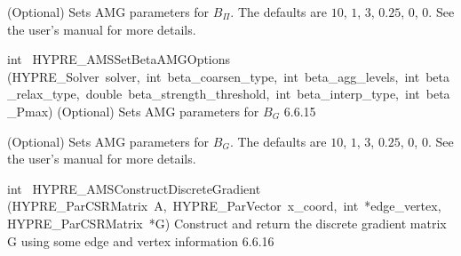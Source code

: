 \documentclass{article}
\begin{document}
\begin{cxxentry}
\begin{cxxentry}
\begin{cxxfunction}
\begin{cxxdoc}
(Optional) Sets AMG parameters for $B_\Pi$.
The defaults are $10$, $1$, $3$, $0.25$, $0$, $0$. See the user's manual for more details.
\end{cxxdoc}
\end{cxxfunction}
\begin{cxxfunction}
{int\ }
        {HYPRE\_AMSSetBetaAMGOptions}
        {(HYPRE\_Solver\ solver,\ int\ beta\_coarsen\_type,\ int\ beta\_agg\_levels,\ int\ beta\_relax\_type,\ double\ beta\_strength\_threshold,\ int\ beta\_interp\_type,\ int\ beta\_Pmax)}
        {
(Optional) Sets AMG parameters for $B_G$}
        {6.6.15}
\begin{cxxdoc}

(Optional) Sets AMG parameters for $B_G$.
The defaults are $10$, $1$, $3$, $0.25$, $0$, $0$. See the user's manual for more details.
\end{cxxdoc}
\end{cxxfunction}
\begin{cxxfunction}
{int\ }
        {HYPRE\_AMSConstructDiscreteGradient}
        {(HYPRE\_ParCSRMatrix\ A,\ HYPRE\_ParVector\ x\_coord,\ int\ *edge\_vertex,\ HYPRE\_ParCSRMatrix\ *G)}
        {
Construct and return the discrete gradient matrix G using some
edge and vertex information}
        {6.6.16}
\begin{cxxdoc}


\end{cxxdoc}
\end{cxxfunction}
\end{cxxentry}
\end{cxxentry}
\end{document}
